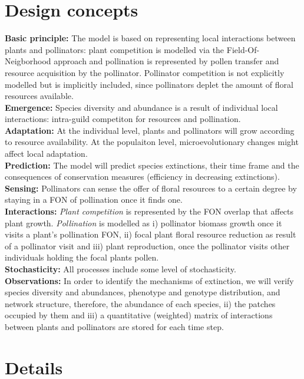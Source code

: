 \documentclass[11pt, a4paper]{article}
\begin{document}
\section{Design concepts}
\textbf{Basic principle:} The model is based on representing local interactions between plants and pollinators: plant competition is modelled via the Field-Of-Neigborhood approach and pollination is represented by pollen transfer and resource acquisition by the pollinator. Pollinator competition is not explicitly modelled but is implicitly included, since pollinators deplet the amount of floral resources available.\\
\textbf{Emergence:} Species diversity  and abundance is a result of individual local interactions: intra-guild competiton for resources and pollination.\\
\textbf{Adaptation:} At the individual level, plants and pollinators will grow according to resource availability. At the populaiton level, microevolutionary changes might affect local adaptation.\\
\textbf{Prediction:} The model will predict species extinctions, their time frame and the consequences of conservation measures (efficiency in decreasing extinctions).\\
\textbf{Sensing:} Pollinators can sense the offer of floral resources to a certain degree by staying in a FON of pollination once it finds one.\\
\textbf{Interactions:} \textit{Plant competition} is represented by the FON overlap that affects plant growth. \textit{Pollination} is modelled as i) pollinator biomass growth once it visits a plant’s pollination FON,  ii) focal plant floral resource reduction as result of a pollinator visit and iii) plant reproduction, once the pollinator visits other individuals holding the focal plant\textquotesingle s pollen.\\
\textbf{Stochasticity:} All processes include some level of stochasticity.\\
\textbf{Observations:} In order to identify the mechanisms of extinction, we will verify species diversity and abundances, phenotype and genotype distribution, and network structure, therefore, the abundance of each species, ii) the patches occupied by them and iii) a quantitative (weighted) matrix of interactions between plants and pollinators are stored for each time step.\\

\section{Details}
\end{document}
